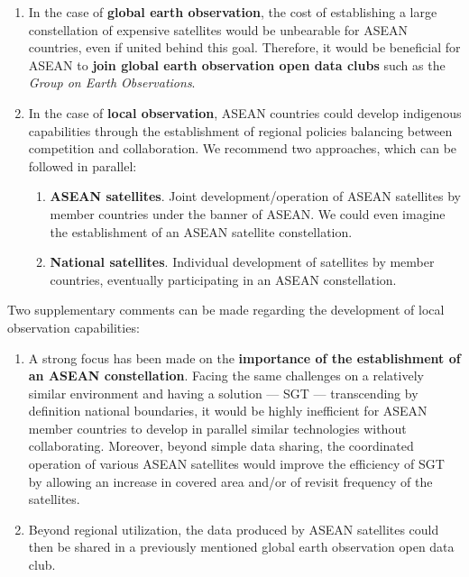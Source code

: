 \begin{enumerate}

\item In the case of \textbf{global earth observation}, the cost of establishing a large constellation of expensive satellites would be unbearable for ASEAN countries, even if united behind this goal. Therefore, it would be beneficial for ASEAN to \textbf{join global earth observation open data clubs} such as the \textit{Group on Earth Observations}.

\item In the case of \textbf{local observation}, ASEAN countries could develop indigenous capabilities through the establishment of regional policies balancing between competition and collaboration. We recommend two approaches, which can be followed in parallel:

	\begin{enumerate}
	\item \textbf{ASEAN satellites}. Joint development/operation of ASEAN satellites by member countries under the banner of ASEAN. We could even imagine the establishment of an ASEAN satellite constellation.
	\item \textbf{National satellites}. Individual development of satellites by member countries, eventually participating in an ASEAN constellation.
	\end{enumerate}

\end{enumerate}

Two supplementary comments can be made regarding the development of local observation capabilities:

\begin{enumerate}

\item A strong focus has been made on the \textbf{importance of the establishment of an ASEAN constellation}. Facing the same challenges on a relatively similar environment and having a solution --- SGT --- transcending by definition national boundaries, it would be highly inefficient for ASEAN member countries to develop in parallel similar technologies without collaborating. Moreover, beyond simple data sharing, the coordinated operation of various ASEAN satellites would improve the efficiency of SGT by allowing an increase in covered area and/or of revisit frequency of the satellites.

\item Beyond regional utilization, the data produced by ASEAN satellites could then be shared in a previously mentioned global earth observation open data club.

\end{enumerate}

